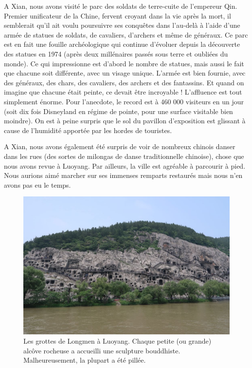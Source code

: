 A Xian, nous avons visité le parc des soldats de terre-cuite de
l'empereur Qin. Premier unificateur de la Chine, fervent croyant dans la
vie après la mort, il semblerait qu'il ait voulu poursuivre ses
conquêtes dans l'au-delà à l'aide d'une armée de statues de soldats, de
cavaliers, d'archers et même de généraux. Ce parc est en fait une
fouille archéologique qui continue d'évoluer depuis la découverte des
statues en 1974 (après deux millénaires passés sous terre et oubliées du
monde). Ce qui impressionne est d'abord le nombre de statues, mais aussi
le fait que chacune soit différente, avec un visage unique. L'armée est
bien fournie, avec des généraux, des chars, des cavaliers, des archers
et des fantassins. Et quand on imagine que chacune était peinte, ce
devait être incroyable ! L'affluence est tout simplement énorme. Pour
l'anecdote, le record est à 460 000 visiteurs en un jour (soit dix fois
Disneyland en régime de pointe, pour une surface visitable bien
moindre). On est à peine surpris que le sol du pavillon d'exposition est
glissant à cause de l'humidité apportée par les hordes de touristes.

A Xian, nous avons également été surpris de voir de nombreux chinois
danser dans les rues (des sortes de milongas de danse traditionnelle
chinoise), chose que nous avons revue à Luoyang. Par ailleurs, la ville
est agréable à parcourir à pied. Nous aurions aimé marcher sur ses
immenses remparts restaurés mais nous n'en avons pas eu le temps.

\begin{figure}
\centering
\includegraphics{images/20180622_luoyang.JPG}
\caption{Les grottes de Longmen à Luoyang. Chaque petite (ou grande)
alcôve rocheuse a accueilli une sculpture bouddhiste. Malheureusement,
la plupart a été pillée.}
\end{figure}


